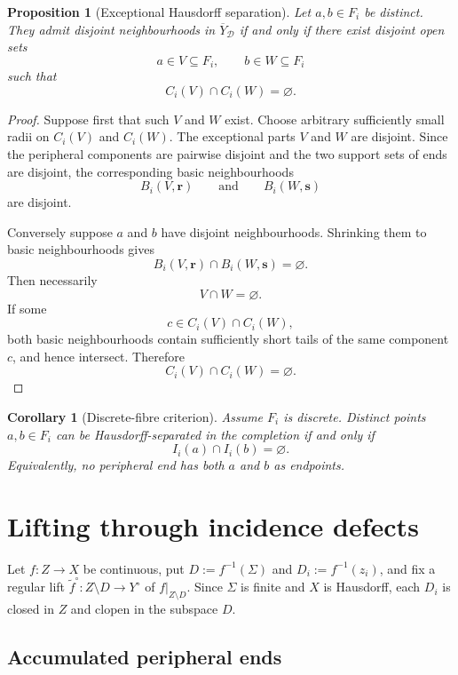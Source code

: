 \documentclass[11pt]{article}
\theoremstyle{plain}
\newtheorem{proposition}[theorem]{Proposition}
\newtheorem{corollary}[theorem]{Corollary}
\theoremstyle{definition}
\begin{document}
\begin{proposition}[Exceptional Hausdorff separation]
\label{prop:exceptional-Hausdorff-separation}
Let $a,b\in F_i$ be distinct.  They admit disjoint neighbourhoods in
$\overline Y_{\mathcal D}$ if and only if there exist disjoint open sets
\[
a\in V\subseteq F_i,
\qquad
b\in W\subseteq F_i
\]
such that
\[
C_i(V)\cap C_i(W)=\varnothing.
\]
\end{proposition}

\begin{proof}
Suppose first that such $V$ and $W$ exist.  Choose arbitrary sufficiently
small radii on $C_i(V)$ and $C_i(W)$.  The exceptional parts $V$ and $W$
are disjoint.  Since the peripheral components are pairwise disjoint and
the two support sets of ends are disjoint, the corresponding basic
neighbourhoods
\[
B_i(V,\mathbf r)
\qquad\text{and}\qquad
B_i(W,\mathbf s)
\]
are disjoint.

Conversely suppose $a$ and $b$ have disjoint neighbourhoods.  Shrinking
them to basic neighbourhoods gives
\[
B_i(V,\mathbf r)
\cap
B_i(W,\mathbf s)
=
\varnothing.
\]
Then necessarily
\[
V\cap W=\varnothing.
\]
If some
\[
c\in C_i(V)\cap C_i(W),
\]
both basic neighbourhoods contain sufficiently short tails of the same
component $c$, and hence intersect.  Therefore
\[
C_i(V)\cap C_i(W)=\varnothing.
\]
\end{proof}

\begin{corollary}[Discrete-fibre criterion]
\label{cor:discrete-Hausdorff-separation}
Assume $F_i$ is discrete.  Distinct points $a,b\in F_i$ can be
Hausdorff-separated in the completion if and only if
\[
I_i(a)\cap I_i(b)=\varnothing.
\]
Equivalently, no peripheral end has both $a$ and $b$ as endpoints.
\end{corollary}




\section{Lifting through incidence defects}
\label{sec:incidence-lifting}

Let $f:Z\to X$ be continuous, put $D:=f^{-1}(\Sigma)$ and
$D_i:=f^{-1}(z_i)$, and fix a regular lift
$\widetilde f^\circ:Z\setminus D\to Y^\circ$ of $f|_{Z\setminus D}$.  Since
$\Sigma$ is finite and $X$ is Hausdorff, each $D_i$ is closed in $Z$ and clopen in the
subspace $D$.


\subsection{Accumulated peripheral ends}
\label{subsec:accumulated-ends}
\end{document}
